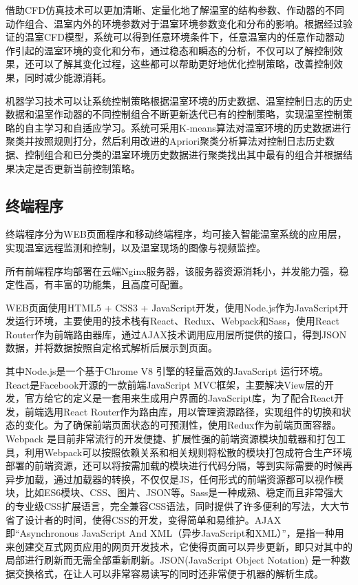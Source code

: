 借助CFD仿真技术可以更加清晰、定量化地了解温室的结构参数、作动器的不同动作组合、温室内外的环境参数对于温室环境参数变化和分布的影响。根据经过验证的温室CFD模型，系统可以得到任意环境条件下，任意温室内的任意作动器动作引起的温室环境的变化和分布，通过稳态和瞬态的分析，不仅可以了解控制效果，还可以了解其变化过程，这些都可以帮助更好地优化控制策略，改善控制效果，同时减少能源消耗。

机器学习技术可以让系统控制策略根据温室环境的历史数据、温室控制日志的历史数据和温室作动器的不同控制组合不断更新迭代已有的控制策略，实现温室控制策略的自主学习和自适应学习。系统可采用K-means算法对温室环境的历史数据进行聚类并按照规则打分，然后利用改进的Apriori聚类分析算法对控制日志历史数据、控制组合和已分类的温室环境历史数据进行聚类找出其中最有的组合并根据结果决定是否更新当前控制策略。

	\subsection{终端程序}
终端程序分为WEB页面程序和移动终端程序，均可接入智能温室系统的应用层，实现温室远程监测和控制，以及温室现场的图像与视频监控。

所有前端程序均部署在云端Nginx服务器，该服务器资源消耗小，并发能力强，稳定性高，有丰富的功能集，且高度可配置。

WEB页面使用HTML5 + CSS3 + JavaScript开发，使用Node.js作为JavaScript开发运行环境，主要使用的技术栈有React、Redux、Webpack和Sass，使用React Router作为前端路由器库，通过AJAX技术调用应用层所提供的接口，得到JSON数据，并将数据按照自定格式解析后展示到页面。

其中Node.js是一个基于Chrome V8 引擎的轻量高效的JavaScript 运行环境。React是Facebook开源的一款前端JavaScript MVC框架，主要解决View层的开发，官方给它的定义是一套用来生成用户界面的JavaScript库，为了配合React开发，前端选用React Router作为路由库，用以管理资源路径，实现组件的切换和状态的变化。为了确保前端页面状态的可预测性，使用Redux作为前端页面容器。Webpack 是目前非常流行的开发便捷、扩展性强的前端资源模块加载器和打包工具，利用Webpack可以按照依赖关系和相关规则将松散的模块打包成符合生产环境部署的前端资源，还可以将按需加载的模块进行代码分隔，等到实际需要的时候再异步加载，通过加载器的转换，不仅仅是JS，任何形式的前端资源都可以视作模块，比如ES6模块、CSS、图片、JSON等。Sass是一种成熟、稳定而且非常强大的专业级CSS扩展语言，完全兼容CSS语法，同时提供了许多便利的写法，大大节省了设计者的时间，使得CSS的开发，变得简单和易维护。AJAX即“Asynchronous JavaScript And XML（异步JavaScript和XML）”，是指一种用来创建交互式网页应用的网页开发技术，它使得页面可以异步更新，即只对其中的局部进行刷新而无需全部重新刷新。JSON(JavaScript Object Notation) 是一种数据交换格式，在让人可以非常容易读写的同时还非常便于机器的解析生成。

